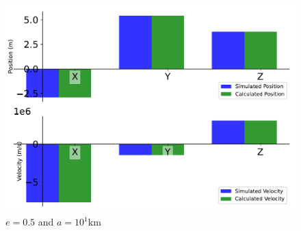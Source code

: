 \begin{figure}[htbp]\centerline{\includegraphics[height=0.7\textwidth, keepaspectratio]{AutoTeX/IncEllip_a_2}}\caption{$e = 0.5$ and $a = 10^1$km}\label{fig:IncEllip_a_2}\end{figure}